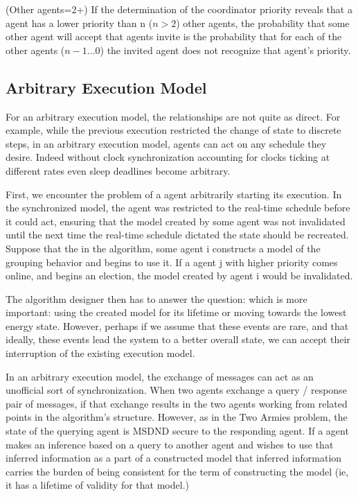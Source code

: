 (Other agents=2+) If the determination of the coordinator priority reveals that a agent has a lower priority than n ($n > 2$) other agents, the probability that some other agent will accept that agents invite is the probability that for each of the other agents ($n-1 ... 0$) the invited agent does not recognize that agent's priority.


\subsection{Arbitrary Execution Model}

For an arbitrary execution model, the relationships are not quite as direct. For example, while the previous execution restricted the change of state to discrete steps, in an arbitrary execution model, agents can act on any schedule they desire. Indeed without clock synchronization accounting for clocks ticking at different rates even sleep deadlines become arbitrary.

First, we encounter the problem of a agent arbitrarily starting its execution. In the synchronized model, the agent was restricted to the real-time schedule before it could act, ensuring that the model created by some agent was not invalidated until the next time the real-time schedule dictated the state should be recreated. Suppose that the in the algorithm,  some agent i constructs a model of the grouping behavior and begins to use it. If a agent j with higher priority comes online, and begins an election, the model created by agent i would be invalidated. 

The algorithm designer then has to answer the question: which is more important: using the created model for its lifetime or moving towards the lowest energy state. However, perhaps if we assume that these events are rare, and that ideally, these events lead the system to a better overall state, we can accept their interruption of the existing execution model.

In an arbitrary execution model, the exchange of messages can act as an unofficial sort of synchronization. When two agents exchange a query / response pair of messages, if that exchange results in the two agents working from related points in the algorithm's structure. However, as in the Two Armies problem, the state of the querying agent is MSDND secure to the responding agent. If a agent makes an inference based on a query to another agent and wishes to use that inferred information as a part of a constructed model that inferred information carries the burden of being consistent for the term of constructing the model (ie, it has a lifetime of validity for that model.)

